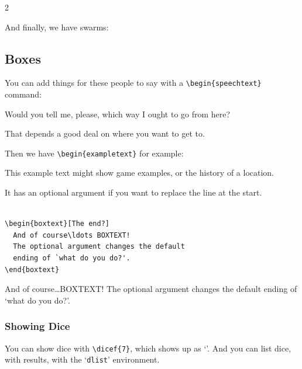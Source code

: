\documentclass[a4paper,openany]{book}
\begin{document}
\begin{multicols}{2}
\togglefalse{genExamples}


\humansoldier

And finally, we have swarms:


\subsection{Boxes}

You can add things for these people to say with a \verb"\begin{speechtext}" command:

\begin{speechtext}

  Would you tell me, please, which way I ought to go from here?

  That depends a good deal on where you want to get to.

\end{speechtext}

Then we have \verb"\begin{exampletext}" for example:

\begin{exampletext}
  This example text might show game examples, or the history of a location.

  It has an optional argument if you want to replace the line at the start.

\end{exampletext}

\begin{verbatim}

\begin{boxtext}[The end?]
  And of course\ldots BOXTEXT!
  The optional argument changes the default
  ending of `what do you do?'.
\end{boxtext}

\end{verbatim}

\begin{boxtext}
  And of course\ldots BOXTEXT!
  The optional argument changes the default
  ending of `what do you do?'.
\end{boxtext}

\subsubsection{Showing Dice}

You can show dice with \verb"\dicef{7}", which shows up as `'.
And you can list dice, with results, with the `\texttt{dlist}' environment.


\end{multicols}
\end{document}
